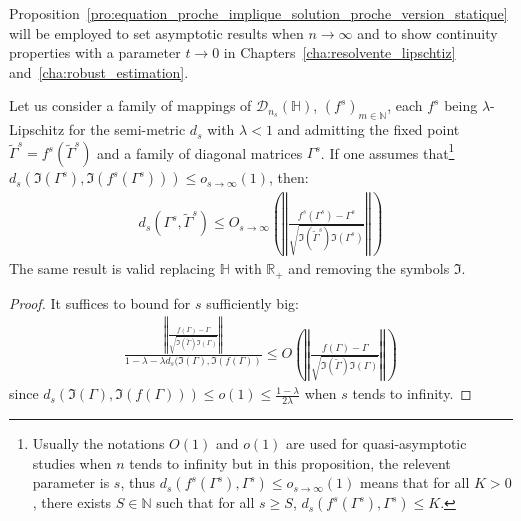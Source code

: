 \documentclass[a4papaer, titlepage]{book}
\begin{document}
Proposition~\ref{pro:equation_proche_implique_solution_proche_version_statique} will be employed to set asymptotic results when $n \to \infty$ and to show continuity properties with a parameter $t\to 0$ in Chapters~\ref{cha:resolvente_lipschtiz} and~\ref{cha:robust_estimation}.
  \begin{proposition}\label{pro:equation_proche_implique_solution_proche_version2}
  Let us consider a family of mappings of $\mathcal D_{n_s} (\mathbb H)$, $(f^s)_{m \in \mathbb N}$, each $f^s$ being $\lambda$-Lipschitz
  for the semi-metric $d_s$ with $\lambda < 1$ and admitting the fixed point $\tilde \Gamma^s = f^s(\tilde \Gamma^s)$ and a family of diagonal matrices $\Gamma^s$. 
  If one assumes that\footnote{Usually the notations $O(1)$ and $o(1)$ are used for quasi-asymptotic studies when $n$ tends to infinity but in this proposition, the relevent parameter is $s$, thus $d_s(f^s(\Gamma^s), \Gamma^s) \leq o_{s \to \infty}(1)$ means that for all $K>0$, there exists $S \in \mathbb N$ such that for all $s \geq S$, $d_s(f^s(\Gamma^s), \Gamma^s) \leq K$.} 
  $d_s(\Im(\Gamma^s), \Im(f^s(\Gamma^s))) \leq o_{s \to \infty}(1)$, then:
  \begin{align*}
    d_s( \Gamma^s , \tilde \Gamma^s)\leq O_{s \to \infty} 
    \left(\left\Vert \frac{f^s(\Gamma^s) - \Gamma^s}{\sqrt{\Im(\tilde \Gamma^s) \Im(\Gamma^s)}}\right\Vert\right)
  \end{align*}
  The same result is valid replacing $\mathbb H$ with $\mathbb R_+$ and removing the symbols $\Im$.
  \end{proposition}

\begin{proof}
  It suffices to bound for $s$ sufficiently big:  
  \begin{align*}
    \frac{\left\Vert \frac{f(\Gamma) - \Gamma}{\sqrt{\Im(\tilde \Gamma) \Im(\Gamma)}}\right\Vert}{1 - \lambda- \lambda d_s(\Im(\Gamma), \Im(f(\Gamma))} 
     \leq O \left(\left\Vert \frac{f(\Gamma) - \Gamma}{\sqrt{\Im(\tilde \Gamma) \Im(\Gamma)}}\right\Vert\right)
  \end{align*}
  since $d_s(\Im(\Gamma), \Im(f(\Gamma))) \leq o(1) \leq \frac{1-\lambda}{2\lambda}$ when $s$ tends to infinity.
\end{proof}
\end{document}
